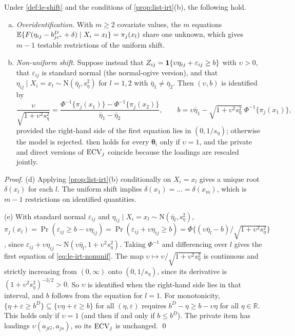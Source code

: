 \begin{proposition}\label{prop:list-irt-ext}
Under \cref{def:le-shift} and the conditions of \cref{prop:list-irt}(b), the following hold.
\begin{enumerate}[(a),start=4]
  \item \emph{Overidentification.} With $m\ge2$ covariate values, the $m$ equations $\mathbb{E}\{F(\eta_{ij}-b^D_{jc^*}+\delta)\mid X_i=x_l\}=\pi_j(x_l)$ share one unknown, which gives $m-1$ testable restrictions of the uniform shift.
  \item \emph{Non-uniform shift.} Suppose instead that $Z_{ij}=\mathbf{1}\!\left\{\upsilon\eta_{ij}+\varepsilon_{ij}\ge b\right\}$ with $\upsilon>0$, that $\varepsilon_{ij}$ is standard normal (the normal-ogive version), and that $\eta_{ij}\mid X_i=x_l\sim\mathrm N(\bar\eta_l,s_\eta^2)$ for $l=1,2$ with $\bar\eta_1\ne\bar\eta_2$. Then $(\upsilon,b)$ is identified by
  \begin{equation}\label{eq:le-irt-nonunif}
    \frac{\upsilon}{\sqrt{1+\upsilon^2s_\eta^2}}=\frac{\Phi^{-1}\{\pi_j(x_1)\}-\Phi^{-1}\{\pi_j(x_2)\}}{\bar\eta_1-\bar\eta_2},\qquad
    b=\upsilon\bar\eta_1-\sqrt{1+\upsilon^2s_\eta^2}\;\Phi^{-1}\{\pi_j(x_1)\},
  \end{equation}
  provided the right-hand side of the first equation lies in $(0,1/s_\eta)$; otherwise the model is rejected.
   then holds for every $\bm\theta_i$ only if $\upsilon=1$, and the private and direct versions of $\mathrm{ECV}_j$ coincide because the loadings are rescaled jointly.
\end{enumerate}
\end{proposition}

\emph{Proof.} (d) Applying \cref{prop:list-irt}(b) conditionally on $X_i=x_l$ gives a unique root $\delta(x_l)$ for each $l$. The uniform shift implies $\delta(x_1)=\dots=\delta(x_m)$, which is $m-1$ restrictions on identified quantities.

(e) With standard normal $\varepsilon_{ij}$ and $\eta_{ij}\mid X_i=x_l\sim\mathrm N(\bar\eta_l,s_\eta^2)$, $\pi_j(x_l)=\Pr(\varepsilon_{ij}\ge b-\upsilon\eta_{ij})=\Pr(\varepsilon_{ij}+\upsilon\eta_{ij}\ge b)=\Phi\{(\upsilon\bar\eta_l-b)/\sqrt{1+\upsilon^2s_\eta^2}\}$, since $\varepsilon_{ij}+\upsilon\eta_{ij}\sim\mathrm N(\upsilon\bar\eta_l,1+\upsilon^2s_\eta^2)$. Taking $\Phi^{-1}$ and differencing over $l$ gives the first equation of \eqref{eq:le-irt-nonunif}. The map $\upsilon\mapsto\upsilon/\sqrt{1+\upsilon^2s_\eta^2}$ is continuous and strictly increasing from $(0,\infty)$ onto $(0,1/s_\eta)$, since its derivative is $(1+\upsilon^2s_\eta^2)^{-3/2}>0$. So $\upsilon$ is identified when the right-hand side lies in that interval, and $b$ follows from the equation for $l=1$. For monotonicity, $\{\eta+\varepsilon\ge b^D\}\subseteq\{\upsilon\eta+\varepsilon\ge b\}$ for all $(\eta,\varepsilon)$ requires $b^D-\eta\ge b-\upsilon\eta$ for all $\eta\in\mathbb R$. This holds only if $\upsilon=1$ (and then if and only if $b\le b^D$). The private item has loadings $\upsilon(a_{jG},a_{js})$, so its $\mathrm{ECV}_j$ is unchanged. \qed

